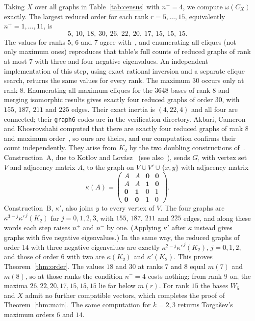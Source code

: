 \documentclass[11pt]{amsart}
\theoremstyle{definition}
\theoremstyle{remark}
\begin{document}
Taking $X$ over all graphs in Table~\ref{tab:census} with $n^-=4$, we compute $\omega(C_X)$ exactly. The largest reduced order for each rank $r=5,\dots,15$, equivalently $n^+=1,\dots,11$, is
\[
5,\ 10,\ 18,\ 30,\ 26,\ 22,\ 20,\ 17,\ 15,\ 15,\ 15 .
\]
The values for ranks $5$, $6$ and $7$ agree with~\cite[Table~2]{ACK2004}, and enumerating all cliques (not only maximum ones) reproduces that table's full counts of reduced graphs of rank at most $7$ with three and four negative eigenvalues. An independent implementation of this step, using exact rational inversion and a separate clique search, returns the same values for every rank. The maximum $30$ occurs only at rank $8$. Enumerating all maximum cliques for the $3648$ bases of rank $8$ and merging isomorphic results gives exactly four reduced graphs of order $30$, with $155$, $187$, $211$ and $225$ edges. Their exact inertia is $(4,22,4)$ and all four are connected; their \texttt{graph6} codes are in the verification directory. Akbari, Cameron and Khosrovshahi computed that there are exactly four reduced graphs of rank $8$ and maximum order~\cite[Table~1]{ACK2004}, so ours are theirs, and our computation confirms their count independently. They arise from $K_2$ by the two doubling constructions of~\cite[\S4]{ACK2004}. Construction~A, due to Kotlov and Lov\'asz~\cite{KotlovLovasz1996} (see also~\cite[Theorem~2.2]{AEKPT2026}), sends $G$, with vertex set $V$ and adjacency matrix $A$, to the graph on $V\cup V'\cup\{x,y\}$ with adjacency matrix
\[
\kappa(A)=\begin{pmatrix}A&A&\mathbf 0&\mathbf 0\\A&A&\mathbf 1&\mathbf 0\\\mathbf 0&\mathbf 1&0&1\\\mathbf 0&\mathbf 0&1&0\end{pmatrix}.
\]
Construction~B, $\kappa'$, also joins $y$ to every vertex of $V$. The four graphs are $\kappa^{3-j}\kappa'^{\,j}(K_2)$ for $j=0,1,2,3$, with $155$, $187$, $211$ and $225$ edges, and along these words each step raises $n^+$ and $n^-$ by one. (Applying $\kappa'$ after $\kappa$ instead gives graphs with five negative eigenvalues.) In the same way, the reduced graphs of order $14$ with three negative eigenvalues are exactly $\kappa^{2-j}\kappa'^{\,j}(K_2)$, $j=0,1,2$, and those of order $6$ with two are $\kappa(K_2)$ and $\kappa'(K_2)$. This proves Theorem~\ref{thm:order}. The values $18$ and $30$ at ranks $7$ and $8$ equal $m(7)$ and $m(8)$, so at those ranks the condition $n^-=4$ costs nothing; from rank $9$ on, the maxima $26,22,20,17,15,15,15$ lie far below $m(r)$. For rank $15$ the bases $W_5$ and $X$ admit no further compatible vectors, which completes the proof of Theorem~\ref{thm:main}. The same computation for $k=2,3$ returns Torga\v{s}ev's maximum orders $6$ and $14$.
\end{document}
